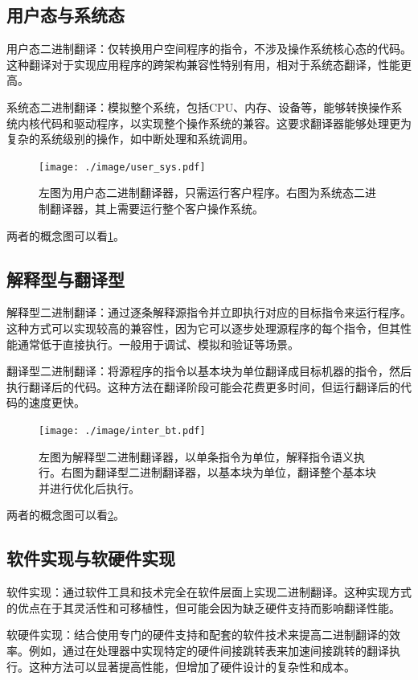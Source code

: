 \subsection{用户态与系统态}
用户态二进制翻译：仅转换用户空间程序的指令，不涉及操作系统核心态的代码。这种翻译对于实现应用程序的跨架构兼容性特别有用，相对于系统态翻译，性能更高。

系统态二进制翻译：模拟整个系统，包括CPU、内存、设备等，能够转换操作系统内核代码和驱动程序，以实现整个操作系统的兼容。这要求翻译器能够处理更为复杂的系统级别的操作，如中断处理和系统调用。

\begin{figure}[h]
  \centering
  \texttt{[image: ./image/user\_sys.pdf]}
  \caption{左图为用户态二进制翻译器，只需运行客户程序。右图为系统态二进制翻译器，其上需要运行整个客户操作系统。}
  \label{img:user_sys}
\end{figure}

两者的概念图可以看\ref{img:user_sys}。

\subsection{解释型与翻译型}
解释型二进制翻译：通过逐条解释源指令并立即执行对应的目标指令来运行程序。这种方式可以实现较高的兼容性，因为它可以逐步处理源程序的每个指令，但其性能通常低于直接执行。一般用于调试、模拟和验证等场景。

翻译型二进制翻译：将源程序的指令以基本块为单位翻译成目标机器的指令，然后执行翻译后的代码。这种方法在翻译阶段可能会花费更多时间，但运行翻译后的代码的速度更快。

\begin{figure}[h]
  \centering
  \texttt{[image: ./image/inter\_bt.pdf]}
  \caption{左图为解释型二进制翻译器，以单条指令为单位，解释指令语义执行。右图为翻译型二进制翻译器，以基本块为单位，翻译整个基本块并进行优化后执行。}
  \label{img:inter_bt}
\end{figure}

两者的概念图可以看\ref{img:inter_bt}。

\subsection{软件实现与软硬件实现}
软件实现：通过软件工具和技术完全在软件层面上实现二进制翻译。这种实现方式的优点在于其灵活性和可移植性，但可能会因为缺乏硬件支持而影响翻译性能。

软硬件实现：结合使用专门的硬件支持和配套的软件技术来提高二进制翻译的效率。例如，通过在处理器中实现特定的硬件间接跳转表来加速间接跳转的翻译执行。这种方法可以显著提高性能，但增加了硬件设计的复杂性和成本。

